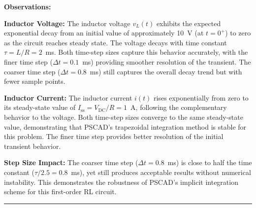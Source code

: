\textbf{Observations:}

\textbf{Inductor Voltage:} The inductor voltage $v_L(t)$ exhibits the expected exponential decay from an initial value of approximately 10~V (at $t = 0^+$) to zero as the circuit reaches steady state. The voltage decays with time constant $\tau = L/R = 2$~ms. Both time-step sizes capture this behavior accurately, with the finer time step ($\Delta t = 0.1$~ms) providing smoother resolution of the transient. The coarser time step ($\Delta t = 0.8$~ms) still captures the overall decay trend but with fewer sample points.

\textbf{Inductor Current:} The inductor current $i(t)$ rises exponentially from zero to its steady-state value of $I_{\text{ss}} = V_{\text{DC}}/R = 1$~A, following the complementary behavior to the voltage. Both time-step sizes converge to the same steady-state value, demonstrating that PSCAD's trapezoidal integration method is stable for this problem. The finer time step provides better resolution of the initial transient behavior.

\textbf{Step Size Impact:} The coarser time step ($\Delta t = 0.8$~ms) is close to half the time constant ($\tau/2.5 = 0.8$~ms), yet still produces acceptable results without numerical instability. This demonstrates the robustness of PSCAD's implicit integration scheme for this first-order RL circuit.

\vspace{1em}
\noindent\rule{\textwidth}{0.4pt}
